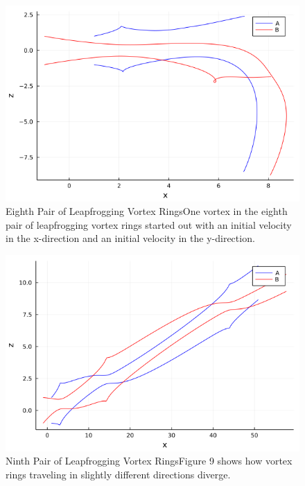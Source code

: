 \documentclass{article}
\begin{document}
\begin{figure}[htb]
	\centering
	\includegraphics[width=\textwidth]{Graph_E.png}
	\caption{Eighth Pair of Leapfrogging Vortex Rings\newline One vortex in the eighth pair of leapfrogging vortex rings started out with an initial velocity in the x-direction and an initial velocity in the y-direction.}
	\label{fig:8}
\end{figure} 

\begin{figure}[htb]
	\centering
	\includegraphics[width=\textwidth]{Graph_F.png}
	\caption{Ninth Pair of Leapfrogging Vortex Rings\newline Figure 9 shows how vortex rings traveling in slightly different directions diverge.}
	\label{fig:9}
\end{figure} 
\end{document}
